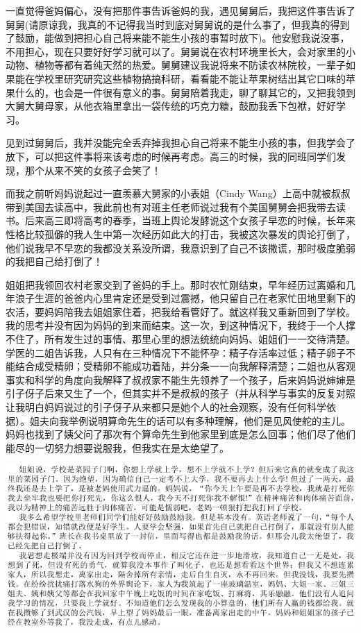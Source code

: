 \documentclass[9pt, b5paper]{article}
\begin{document}
一直觉得爸妈偏心，没有把那件事告诉爸妈的我，遇见舅舅后，我把这件事告诉了舅舅(请原谅我，我真的不记得我当时到底对舅舅说的是什么事了，但我真的得到了鼓励，能做到把担心自己将来能不能生小孩的事暂时放下)。他安慰我说没事，不用担心，现在只要好好学习就可以了。舅舅说在农村环境里长大，会对家里的小动物、植物等都有着纯天然的热爱。舅舅建议我说将来不防读农林院校，一辈子如果能在学校里研究研究这些植物搞搞科研，看看能不能让苹果树结出其它口味的苹果什么的，也会是一件很有意义的事。舅舅陪着我走，聊了聊其它的，又把我领到大舅大舅母家，从他衣箱里拿出一袋传统的巧克力糖，鼓励我丢下包袱，好好学习。

见到过舅舅后，我并没能完全丢弃掉我担心自己将来不能生小孩的事，但我学会了放下，可以把这件事将来该考虑的时候再考虑。高三的时候，我的同班同学们发现，那个从来不笑的女孩子会笑了！

而我之前听妈妈说起过一直羡慕大舅家的小表姐（Cindy Wang）上高中就被叔叔带到美国去读高中，我此前也有对班主任老师说过我有个美国舅舅会把我带去读书。后来高三即将高考的春季，当班上舆论发酵说这个女孩子早恋的时候，长年来性格比较孤僻的我人生中第一次经历如此大的打击，我被这次暴发的舆论打倒了，他们说我早不早恋的我都没关系没所谓，我意识到了自己不该撒谎，那时极度脆弱的我把自己给打倒了！

姐姐把我领回农村老家交到了爸妈的手上。那时农忙刚结束，早年经历过离婚和几年浪子生涯的爸爸内心里肯定还是受到过震撼，他只留自己在老家忙田地里剩下的农活，要妈妈陪我去姐姐家住着，把我给看管好了。就这样我又重新回到了学校。我的思考并没有因为妈妈的到来而结束。这一次，到这种情况下，我终于一个人撑不住了，所有发生过的事情、那里心里的想法统统向妈妈、姐姐们一一交待清楚。学医的二姐告诉我，人只有在三种情况下不能怀孕：精子存活率过低；精子卵子不能结合成受精卵；受精卵不能成功着陆，并分条一一向我解释清楚；二姐也从客观事实和科学的角度向我解释了叔叔家不能生先领养了一个孩子，后来妈妈说婶婶是引子伢子后来又生了一个，但其实并不是叔叔的孩子（并从科学与事实的反复对照让我明白妈妈说过的引子伢子从来都只是她个人的社会观察，没有任何科学依据）。姐夫向我举例说明算命先生的话可以有多种理解，他们是见风使舵的主儿。妈妈也找到了姨父问了那次有个算命先生到他家里到底是怎么回事；他们尽了他们能尽的一切努力想要说服我，但我实在是太绝望了。

\begin{center}
\includegraphics[width=.9\linewidth]{./pic/p1p22-1.png}
\end{center}
\end{document}
